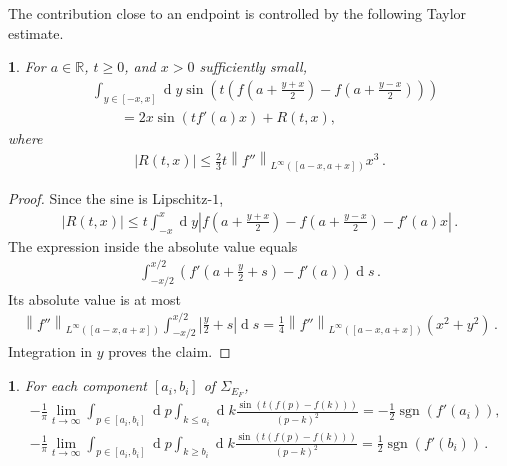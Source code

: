 \documentclass[a4paper,10pt]{article}
\numberwithin{equation}{section}
\theoremstyle{plain}
\theoremstyle{plain}
\newtheorem{lem}[thm]{\protect\lemmaname}
\theoremstyle{plain}
\theoremstyle{plain}
\theoremstyle{plain}
\theoremstyle{remark}
\theoremstyle{definition}
\theoremstyle{plain}
\providecommand{\lemmaname}{Lemma}
\newcommand{\RR}{\mathbb{R}}
\newcommand\norm[1]{\left\lVert#1\right\rVert}
\newcommand{\dif}{\operatorname{d}\!} %
\newcommand{\sgn}{\operatorname{sgn}}
\newcommand{\eq}[1]{\begin{align*}#1\end{align*}}
\begin{document}
The contribution close to an endpoint is controlled by the following Taylor estimate.

\begin{lem}\label{lem:Taylor expansion}
For $a\in\RR$, $t\geq0$, and $x>0$ sufficiently small,
\eq{&\int_{y\in[-x,x]}\dif{y}\sin\left(t\left(f\left(a+\frac{y+x}{2}\right)-f\left(a+\frac{y-x}{2}\right)\right)\right)\\
&\qquad=2x\sin(tf'(a)x)+R(t,x),}
where
\eq{|R(t,x)|\leq\frac{2}{3}t\norm{f''}_{L^\infty([a-x,a+x])}x^3\,.}
\end{lem}

\begin{proof}
Since the sine is Lipschitz-$1$,
\eq{|R(t,x)|\leq t\int_{-x}^{x}\dif{y}\left|f\left(a+\frac{y+x}{2}\right)-f\left(a+\frac{y-x}{2}\right)-f'(a)x\right|\,.}
The expression inside the absolute value equals
\eq{\int_{-x/2}^{x/2}\left(f'\left(a+\frac{y}{2}+s\right)-f'(a)\right)\dif{s}\,.}
Its absolute value is at most
\eq{\norm{f''}_{L^\infty([a-x,a+x])}\int_{-x/2}^{x/2}\left|\frac{y}{2}+s\right|\dif{s}=\frac{1}{4}\norm{f''}_{L^\infty([a-x,a+x])}(x^2+y^2)\,.}
Integration in $y$ proves the claim.
\end{proof}

\begin{lem}\label{lem:endpoint contributions}
For each component $[a_i,b_i]$ of $\Sigma_{E_F}$,
\eq{&-\frac{1}{\pi}\lim_{t\to\infty}\int_{p\in[a_i,b_i]}\dif{p}\int_{k\leq a_i}\dif{k}\frac{\sin\left(t(f(p)-f(k))\right)}{(p-k)^2}=-\frac{1}{2}\sgn(f'(a_i)),\\
&-\frac{1}{\pi}\lim_{t\to\infty}\int_{p\in[a_i,b_i]}\dif{p}\int_{k\geq b_i}\dif{k}\frac{\sin\left(t(f(p)-f(k))\right)}{(p-k)^2}=\frac{1}{2}\sgn(f'(b_i))\,.}
\end{lem}
\end{document}
